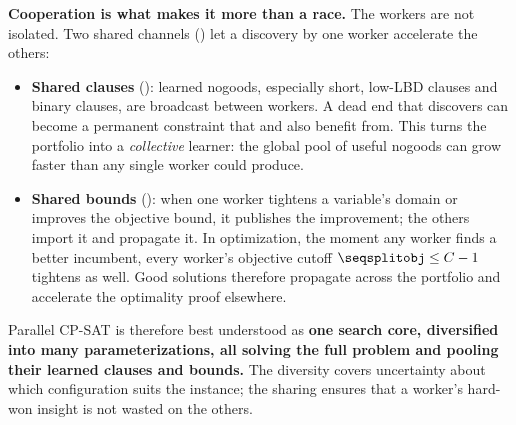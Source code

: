 \textbf{Cooperation is what makes it more than a race.} The workers are not
isolated. Two shared channels () let a discovery by one
worker accelerate the others:

\begin{itemize}
  \item \textbf{Shared clauses}
  (): learned nogoods,
  especially short, low-LBD clauses and binary clauses, are broadcast between
  workers. A dead end that  discovers can become a permanent
  constraint that  and  also benefit from. This
  turns the portfolio into a \emph{collective} learner: the global pool of useful
  nogoods can grow faster than any single worker could produce.
  \item \textbf{Shared bounds}
  (): when one worker tightens
  a variable's domain or improves the objective bound, it publishes the
  improvement; the others import it and propagate it. In optimization, the moment
  any worker finds a better incumbent, every worker's objective cutoff
  $\code{obj} \le C-1$ tightens as well. Good solutions therefore propagate
  across the portfolio and accelerate the optimality proof elsewhere.
\end{itemize}

Parallel CP-SAT is therefore best understood as \textbf{one search core,
diversified into many parameterizations, all solving the full problem and
pooling their learned clauses and bounds.} The diversity covers uncertainty
about which configuration suits the instance; the sharing ensures that a
worker's hard-won insight is not wasted on the others.

